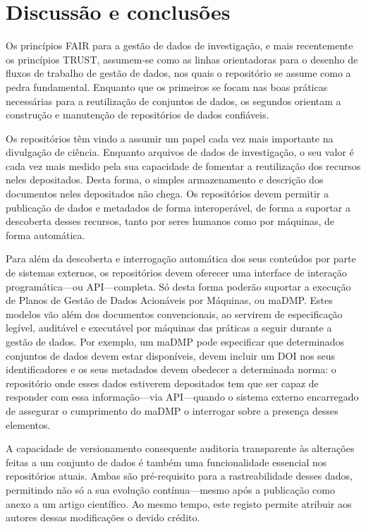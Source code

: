 \documentclass[sigconf,nonacm]{acmart}
\begin{document}
\section{Discussão e conclusões} %
\label{sec:discussao_e_conclusoes}



Os princípios \gls{FAIR} para a gestão de dados de investigação, e mais recentemente os princípios TRUST, assumem-se como as linhas orientadoras para o desenho de fluxos de trabalho de gestão de dados, nos quais o repositório se assume como a pedra fundamental. Enquanto que os primeiros se focam nas boas práticas necessárias para a reutilização de conjuntos de dados, os segundos orientam a construção e manutenção de repositórios de dados confiáveis.

Os repositórios têm vindo a assumir um papel cada vez mais importante na divulgação de ciência. Enquanto arquivos de dados de investigação, o seu valor é cada vez mais medido pela sua capacidade de fomentar a reutilização dos recursos neles depositados. Desta forma, o simples armazenamento e descrição dos documentos neles depositados não chega. Os repositórios devem permitir a publicação de dados e metadados de forma interoperável, de forma a suportar a descoberta desses recursos, tanto por seres humanos como por máquinas, de forma automática.

Para além da descoberta e interrogação automática dos seus conteúdos por parte de sistemas externos, os repositórios devem oferecer uma interface de interação programática---ou API---completa. Só desta forma poderão suportar a execução de Planos de Gestão de Dados Acionáveis por Máquinas, ou \gls{maDMP}. Estes modelos vão além dos documentos convencionais, ao servirem de especificação legível, auditável e executável por máquinas das práticas a seguir durante a gestão de dados. Por exemplo, um \gls{maDMP} pode especificar que determinados conjuntos de dados devem estar disponíveis, devem incluir um DOI nos seus identificadores e os seus metadados devem obedecer a determinada norma: o repositório onde esses dados estiverem depositados tem que ser capaz de responder com essa informação---via API---quando o sistema externo encarregado de assegurar o cumprimento do \gls{maDMP} o interrogar sobre a presença desses elementos.

A capacidade de versionamento consequente auditoria transparente às alterações feitas a um conjunto de dados é também uma funcionalidade essencial nos repositórios atuais. Ambas são pré-requisito para a rastreabilidade desses dados, permitindo não só a sua evolução contínua---mesmo após a publicação como anexo a um artigo científico. Ao mesmo tempo, este registo permite atribuir aos autores dessas modificações o devido crédito.
\end{document}
